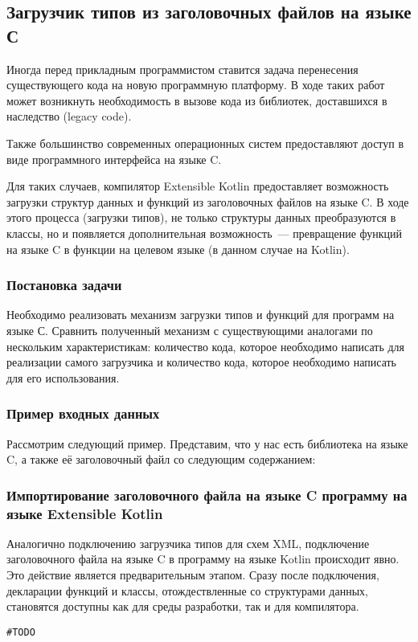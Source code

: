 \subsection{Загрузчик типов из заголовочных файлов на языке С}\label{c-loader}
Иногда перед прикладным программистом ставится задача перенесения существующего кода на новую программную платформу.
В ходе таких работ может возникнуть необходимость в вызове кода из библиотек, доставшихся в наследство (legacy code).

Также большинство современных операционных систем предоставляют доступ в виде программного интерфейса на языке C.

Для таких случаев, компилятор Extensible Kotlin предоставляет возможность загрузки структур данных и функций из заголовочных файлов на языке C.
В ходе этого процесса (загрузки типов), не только структуры данных преобразуются в классы, но и появляется дополнительная возможность~--- превращение функций на языке C в функции на целевом языке (в данном случае на Kotlin).

\subsubsection{Постановка задачи}
\td Необходимо реализовать механизм загрузки типов и функций для программ на языке С.
Сравнить полученный механизм с существующими аналогами по нескольким характеристикам: количество кода, которое необходимо написать для реализации самого загрузчика и количество кода, которое необходимо написать для его использования.

\subsubsection{Пример входных данных}
Рассмотрим следующий пример. Представим, что у нас есть библиотека на языке C, а также её заголовочный файл со следующим содержанием:


\subsubsection{Импортирование заголовочного файла на языке C программу на языке Extensible Kotlin}
Аналогично подключению загрузчика типов для схем XML, подключение заголовочного файла на языке C в программу на языке  Kotlin происходит явно.
Это действие является предварительным этапом. Сразу после подключения, декларации функций и классы, отождествленные со структурами данных, становятся доступны как для среды разработки, так и для компилятора.
\begin{lstlisting}[caption={Подключение заголовочного файла на языке C в программу на языке Kotlin.}, label={c-type-loading-extension-point}]
#TODO
\end{lstlisting}

